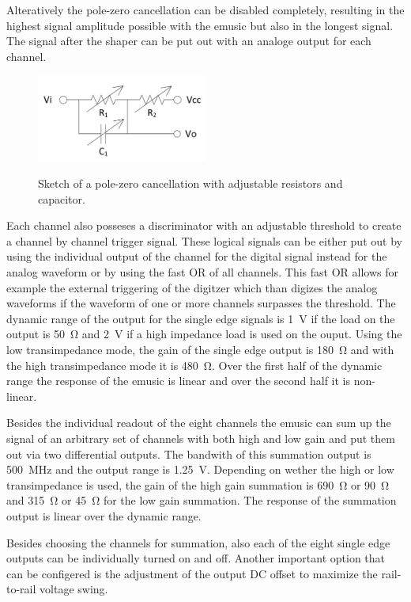 Alteratively the pole-zero cancellation can be disabled completely, resulting in the highest signal amplitude possible with the \ac{emusic} but also in the longest signal.
The signal after the shaper can be put out with an analoge output for each channel.
\begin{figure}
	\centering
	\includegraphics[width=0.5\textwidth]{pictures/emusic_pole_zero.png}
	\label{fig:emusic_pole_zero}
	\caption[eMUSIC pole-zero cancellation]{Sketch of a pole-zero cancellation with adjustable resistors and capacitor.}
\end{figure}

Each channel also posseses a discriminator with an adjustable threshold to create a channel by channel trigger signal.
These logical signals can be either put out by using the individual output of the channel for the digital signal instead for the analog waveform or by using the fast OR of all channels.
This fast OR allows for example the external triggering of the digitzer which than digizes the analog waveforms if the waveform of one or more channels surpasses the threshold.
The dynamic range of the output for the single edge signals is \SI{1}{\volt} if the load on the output is \SI{50}{\ohm} and \SI{2}{\volt} if a high impedance load is used on the ouput.
Using the low transimpedance mode, the gain of the single edge output is \SI{180}{\ohm} and with the high transimpedance mode it is \SI{480}{\ohm}.
Over the first half of the dynamic range the response of the \ac{emusic} is linear and over the second half it is non-linear.

Besides the individual readout of the eight channels the \ac{emusic} can sum up the signal of an arbitrary set of channels with both high and low gain and put them out via two differential outputs.
The bandwith of this summation output is \SI{500}{\mega\hertz} and the output range is \SI{1.25}{\volt}.
Depending on wether the high or low transimpedance is used, the gain of the high gain summation is \SI{690}{\ohm} or \SI{90}{\ohm} and \SI{315}{\ohm} or \SI{45}{\ohm} for the low gain summation. 
The response of the summation output is linear over the dynamic range.

Besides choosing the channels for summation, also each of the eight single edge outputs can be individually turned on and off.
Another important option that can be configered is the adjustment of the output DC offset to maximize the rail-to-rail voltage swing.


